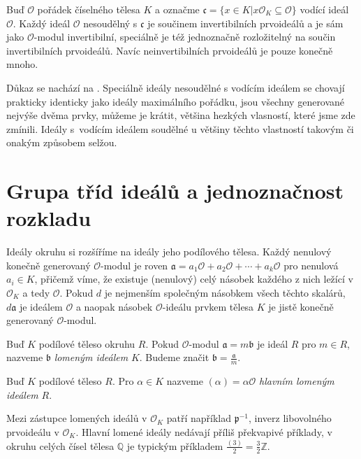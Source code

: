 \documentclass [12pt]{report}
\begin{document}
\begin{veta}
Buď $\mathcal{O}$ pořádek číselného tělesa $K$ a označme $\mathfrak{c} = \lbrace x \in K \vert x \mathcal{O}_K \subseteq \mathcal{O} \rbrace$ vodící ideál $\mathcal{O}$. Každý ideál $\mathcal{O}$ nesoudělný s $\mathfrak{c}$ je součinem invertibilních prvoideálů a je sám jako $\mathcal{O}$-modul invertibilní, speciálně je též jednoznačně rozložitelný na součin invertibilních prvoideálů. Navíc neinvertibilních prvoideálů je pouze konečně mnoho.
\end{veta}

Důkaz se nachází na \cite[Sec. 3.]{Conrad3}. Speciálně ideály nesoudělné s vodícím ideálem se chovají prakticky identicky jako ideály maximálního pořádku, jsou všechny generované nejvýše dvěma prvky, můžeme je krátit, většina hezkých vlasností, které jsme zde zmínili. Ideály s~vodícím ideálem soudělné u většiny těchto vlastností takovým či onakým způsobem selžou.

 

\section{Grupa tříd ideálů a jednoznačnost rozkladu}

Ideály okruhu si rozšíříme na ideály jeho podílového tělesa. Každý nenulový konečně generovaný $\mathcal{O}$-modul je roven $\mathfrak{a} =  a_1 \mathcal{O} + a_2 \mathcal{O} + \cdots + a_k \mathcal{O}$ pro nenulová $a_i \in K$, přičemž víme, že existuje (nenulový) celý násobek každého z nich ležící v $\mathcal{O}_K$ a tedy $\mathcal{O}$. Pokud $d$ je nejmenším společným násobkem všech těchto skalárů, $d \mathfrak{a}$ je ideálem $\mathcal{O}$ a naopak násobek $\mathcal{O}$-ideálu prvkem tělesa $K$ je jistě konečně generovaný $\mathcal{O}$-modul.

\begin{definice}
Buď $K$ podílové těleso okruhu $R$. Pokud $\mathcal{O}$-modul $\mathfrak{a} =  m \mathfrak{b}$ je ideál $R$ pro $m \in R$, nazveme $\mathfrak{b}$ \textit{lomeným ideálem} $K$. Budeme značit $\mathfrak{b} = \frac{\mathfrak{a}}{m}$.
\end{definice}

\begin{definice}
Buď $K$ podílové těleso $R$. Pro $\alpha \in K$ nazveme $(\alpha) = \alpha \mathcal{O}$ \textit{hlavním lomeným ideálem} $R$.
\end{definice}

Mezi zástupce lomených ideálů v $\mathcal{O}_K$ patří například $\mathfrak{p}^{-1}$, inverz libovolného prvoideálu v $\mathcal{O}_K$. Hlavní lomené ideály nedávají příliš překvapivé příklady, v okruhu celých čísel tělesa $\mathbb{Q}$ je typickým příkladem $\frac{(3)}{2} = \frac{3}{2} \mathbb{Z}$.\\
\end{document}
